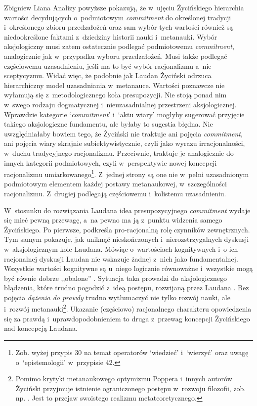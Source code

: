 \begin{artplenv}{Zbigniew Liana}
Analizy powyższe pokazują, że w~ujęciu Życińskiego hierarchia wartości decydujących o~podmiotowym \textit{commitment} do określonej tradycji i~określonego zbioru przedzałożeń oraz sam wybór tych wartości również są niedookreślone faktami z~dziedziny historii nauki i~metanauki. Wybór aksjologiczny musi zatem ostatecznie podlegać podmiotowemu \textit{commitment}, analogicznie jak w~przypadku wyboru przedzałożeń. Musi także podlegać częściowemu uzasadnieniu, jeśli ma to być wybór racjonalizmu a~nie sceptycyzmu. Widać więc, że podobnie jak Laudan Życiński odrzuca hierarchiczny model uzasadniania w~metanauce. Wartości poznawcze nie wyłamują się z~metodologicznego koła presupozycji. Nie stoją ponad nim w~swego rodzaju dogmatycznej i~nieuzasadnialnej przestrzeni aksjologicznej. Wprawdzie kategorie ‘\textit{commitment}' i~‘aktu wiary' mogłyby sugerować przyjęcie takiego aksjologiczne fundamentu, ale byłaby to sugestia błędna. Nie uwzględniałaby bowiem tego, że Życiński nie traktuje ani pojęcia \textit{commitment}, ani pojęcia wiary skrajnie subiektywistycznie, czyli jako wyrazu irracjonalności, w~duchu tradycyjnego racjonalizmu. Przeciwnie, traktuje je analogicznie do innych kategorii podmiotowych, czyli w~perspektywie nowej koncepcji racjonalizmu umiarkowanego\footnote{Zob. wyżej przypis 30 na temat operatorów ‘wiedzieć' i~‘wierzyć' oraz uwagę o~‘epistemologii' w~przypisie 42.}. Z~jednej strony są one nie w~pełni uzasadnionym podmiotowym elementem każdej postawy metanaukowej, w~szczególności racjonalizmu. Z~drugiej podlegają częściowemu i~kolistemu uzasadnieniu.

W~stosunku do rozwiązania Laudana idea presupozycyjnego \textit{commitment} wydaje się mieć pewną przewagę, a~na pewno ma ją z~punktu widzenia samego Życińskiego. Po pierwsze, podkreśla pro-racjonalną rolę czynników zewnętrznych. Tym samym pokazuje, jak uniknąć nieskończonych i~nierozstrzygalnych dyskusji w~aksjologicznym kole Laudana. Mówiąc o~wartościach kognitywnych i~o ich racjonalnej dyskusji Laudan nie wskazuje żadnej z~nich jako fundamentalnej. Wszystkie wartości kognitywne są u~niego logicznie równoważne i~wszystkie mogą być równie dobrze ,,obalone''
\parencite[zob.][s.~23]{grobler_prawda_1993}. %
 Sytuacja taka prowadzi do aksjologicznego błądzenia, które trudno pogodzić z~ideą postępu, rozwijaną przez Laudana 
\parencite[][s.~32–35]{grobler_prawda_1993}. %
 Bez pojęcia \textit{dążenia do prawdy} trudno wytłumaczyć nie tylko rozwój nauki, ale i~rozwój metanauki\footnote{Pomimo krytyki metanaukowego optymizmu Poppera i~innych autorów Życiński przyjmuje istnienie ograniczonego postępu w~rozwoju filozofii, zob. np. 
\parencite[][s.~47–53]{zycinski_teizm_1988}. %
 Jest to przejaw swoistego realizmu metateoretycznego.}. Ukazanie (częściowo) racjonalnego charakteru opowiedzenia się za prawdą i~uprawdopodobnieniem to druga z~przewag koncepcji Życińskiego nad koncepcją Laudana.


\end{artplenv}
